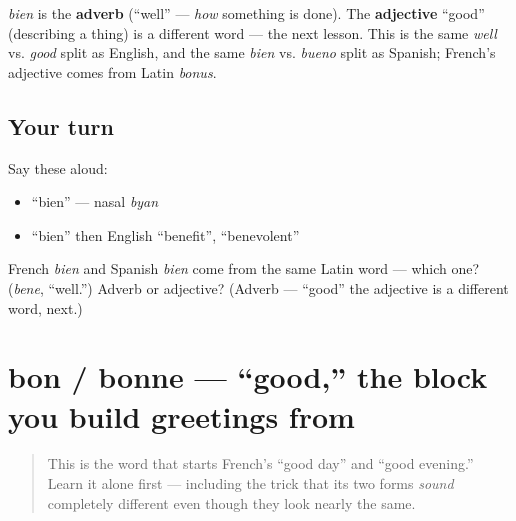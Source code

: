 \begin{grammarlens}[title={Grammar Lens: the \textquotedblleft{}good\textquotedblright{} it pairs with}]
\emph{bien} is the \textbf{adverb} (\textquotedblleft{}well\textquotedblright{} — \emph{how} something is done). The \textbf{adjective} \textquotedblleft{}good\textquotedblright{} (describing a thing) is a different word — the next lesson. This is the same \emph{well} vs. \emph{good} split as English, and the same \emph{bien} vs. \emph{bueno} split as Spanish; French's adjective comes from Latin \emph{bonus}.
\end{grammarlens}

\subsection*{Your turn}
Say these aloud:

\begin{itemize}
\raggedright
  \item \textquotedblleft{}bien\textquotedblright{} — nasal \emph{byan}
  \item \textquotedblleft{}bien\textquotedblright{} then English \textquotedblleft{}benefit\textquotedblright{}, \textquotedblleft{}benevolent\textquotedblright{}
\end{itemize}

\begin{tcolorbox}[breakable,colback=teal!4,colframe=teal!35!black,title={Before you move on}]
French \emph{bien} and Spanish \emph{bien} come from the same Latin word — which one? (\emph{bene}, \textquotedblleft{}well.\textquotedblright{}) Adverb or adjective? (Adverb — \textquotedblleft{}good\textquotedblright{} the adjective is a different word, next.)
\end{tcolorbox}
\section[bon / bonne]{bon / bonne — \textquotedblleft{}good,\textquotedblright{} the block you build greetings from}

\label{lesson:FR-C01-bon}



\begin{quote}
This is the word that starts French's \textquotedblleft{}good day\textquotedblright{} and \textquotedblleft{}good evening.\textquotedblright{} Learn it alone first — including the trick that its two forms \emph{sound} completely different even though they look nearly the same.
\end{quote}

